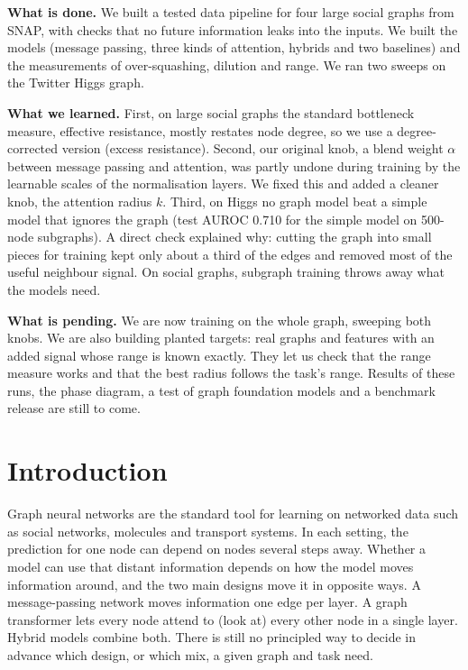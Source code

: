 \textbf{What is done.} We built a tested data pipeline for four large social graphs from SNAP, with checks that no future information leaks into the inputs. We built the models (message passing, three kinds of attention, hybrids and two baselines) and the measurements of over-squashing, dilution and range. We ran two sweeps on the Twitter Higgs graph.

\textbf{What we learned.} First, on large social graphs the standard bottleneck measure, effective resistance, mostly restates node degree, so we use a degree-corrected version (excess resistance). Second, our original knob, a blend weight $\alpha$ between message passing and attention, was partly undone during training by the learnable scales of the normalisation layers. We fixed this and added a cleaner knob, the attention radius $k$. Third, on Higgs no graph model beat a simple model that ignores the graph (test AUROC 0.710 for the simple model on 500-node subgraphs). A direct check explained why: cutting the graph into small pieces for training kept only about a third of the edges and removed most of the useful neighbour signal. On social graphs, subgraph training throws away what the models need.

\textbf{What is pending.} We are now training on the whole graph, sweeping both knobs. We are also building planted targets: real graphs and features with an added signal whose range is known exactly. They let us check that the range measure works and that the best radius follows the task's range. Results of these runs, the phase diagram, a test of graph foundation models and a benchmark release are still to come.

\maintextstart

\section{Introduction}
Graph neural networks are the standard tool for learning on networked data such as social networks, molecules and transport systems. In each setting, the prediction for one node can depend on nodes several steps away. Whether a model can use that distant information depends on how the model moves information around, and the two main designs move it in opposite ways. A message-passing network moves information one edge per layer. A graph transformer lets every node attend to (look at) every other node in a single layer. Hybrid models combine both. There is still no principled way to decide in advance which design, or which mix, a given graph and task need.

